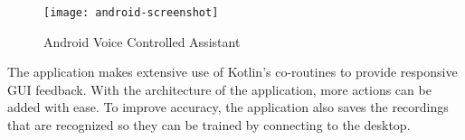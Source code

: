 \begin{figure}[h!]
    \centering
    \texttt{[image: android-screenshot]}
    \label{fig:android-screenshot}
    \caption{Android Voice Controlled Assistant}
\end{figure}

The application makes extensive use of Kotlin’s co-routines to provide responsive GUI feedback. With the architecture of the application, more actions can be added with ease. To improve accuracy, the application also saves the recordings that are recognized so they can be trained by connecting to the desktop.
